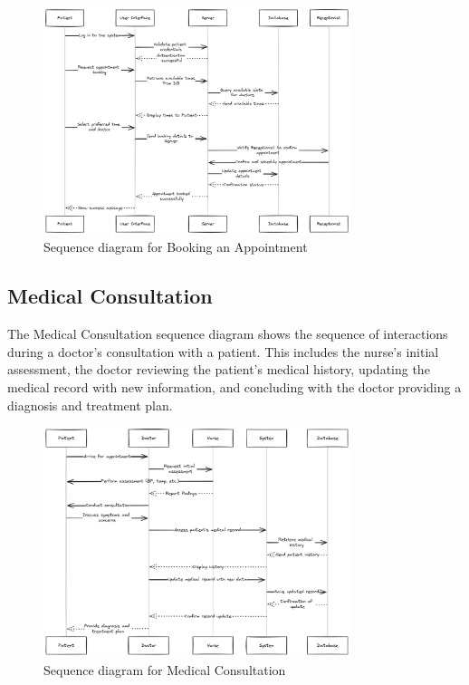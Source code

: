 \documentclass[12pt]{article}
\begin{document}
\begin{figure}[h!]
\centering
\includegraphics[width=0.8\textwidth]{booking_appointment_diagram.png}
\caption{Sequence diagram for Booking an Appointment}
\end{figure}

\subsection*{Medical Consultation}
The Medical Consultation sequence diagram shows the sequence of interactions during a doctor's consultation with a patient. This includes the nurse's initial assessment, the doctor reviewing the patient's medical history, updating the medical record with new information, and concluding with the doctor providing a diagnosis and treatment plan.

\begin{figure}[h!]
\centering
\includegraphics[width=0.8\textwidth]{medical_consultation_diagram.png}
\caption{Sequence diagram for Medical Consultation}
\end{figure}
\end{document}
